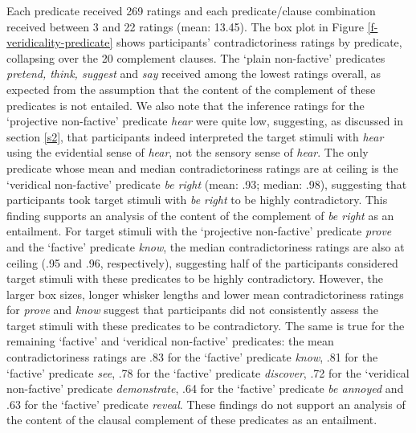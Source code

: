 \documentclass[11pt,fleqn]{article}
\newcommand{\6}{\mbox{$[\hspace*{-.6mm}[$}}
\newcommand{\9}{\mbox{$]\hspace*{-.6mm}]$}}
\begin{document}
{Each predicate received 269 ratings and each predicate/clause combination received between 3 and 22 ratings (mean: 13.45). The box plot in Figure \ref{f-veridicality-predicate} shows participants' contradictoriness ratings by predicate, collapsing over the 20 complement clauses. The `plain non-factive' predicates {\em pretend, think, suggest} and {\em say} received among the lowest ratings overall, as expected from the assumption that the content of the complement of these predicates is not entailed. We also note that the inference ratings for the `projective non-factive' predicate {\em hear} were quite low, suggesting, as discussed in section \ref{s2}, that participants indeed interpreted the target stimuli with {\em hear} using the evidential sense of {\em hear}, not the sensory sense of {\em hear}. The only predicate whose mean and median contradictoriness ratings are at ceiling is the `veridical non-factive' predicate {\em be right} (mean: .93; median: .98), suggesting that participants took target stimuli with {\em be right} to be highly contradictory. This finding supports an analysis of the content of the complement of {\em be right} as an entailment. For target stimuli with the `projective non-factive' predicate {\em prove} and the `factive' predicate {\em know}, the median contradictoriness ratings are also at ceiling (.95 and .96, respectively), suggesting half of the participants considered target stimuli with these predicates to be highly contradictory. However, the larger box sizes, longer whisker lengths and lower mean contradictoriness ratings for {\em prove} and {\em know} suggest that participants did not consistently assess the target stimuli with these predicates to be contradictory. The same is true for the remaining `factive' and `veridical non-factive' predicates: the mean contradictoriness ratings are .83 for the `factive' predicate {\em know}, .81 for the `factive' predicate {\em see}, .78 for the `factive' predicate {\em discover}, .72 for the `veridical non-factive' predicate {\em demonstrate}, .64 for the `factive' predicate {\em be annoyed} and .63 for the `factive' predicate {\em reveal}.  These findings do not support an analysis of the content of the clausal complement of these predicates as an entailment.


}
\end{document}
